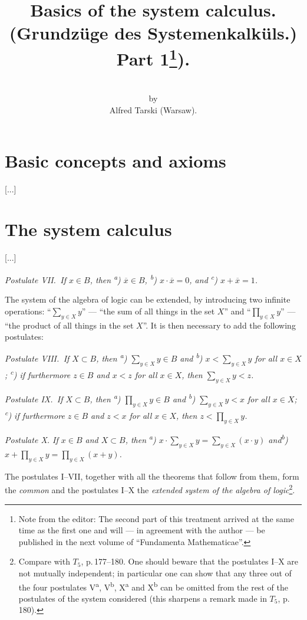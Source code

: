 \documentclass{article}
\author{\\[-2em]{\small by} \\[0.5em] Alfred Tarski (Warsaw).}
\title{Basics of the system calculus. \\ (Grundzüge des Systemenkalküls.) \\ {\small Part 1\footnote{Note from the editor: The second part of this treatment arrived at the same time as the first one and will --- in agreement with the author --- be published in the next volume of ``Fundamenta Mathematicae''.}\;).}}
\date{}%
\theoremstyle{definition}
\begin{document}
\maketitle

\noindent
[...]

\section{Basic concepts and axioms}

[...]

\section{The system calculus}

[...]

\newcommand{\no}[1]{\;\textsuperscript{#1})\;}
\newcommand{\tss}[1]{\textsuperscript{#1}}

\vspace{1em}
\textit{Postulate VII.\, If $x\in B$, then \no{a} $\overline{x}\in B$, \no{b} $x \cdot \overline{x}=0$, and \no{c} $x + \overline{x}=1$.}

\vspace{0.5em}
The system of the algebra of logic can be extended, by introducing two infinite operations: ``$\sum_{y\in X} y$'' --- ``the sum of all things in the set $X$'' and ``$\prod_{y\in X} y$'' --- ``the product of all things in the set $X$''. It is then necessary to add the following postulates:

\vspace{0.5em}
\textit{Postulate VIII.\, If $X\subset B$, then \no{a} $\sum_{y\in X} y\in B$ and \no{b} $x < \sum_{y\in X} y$ for all $x\in X$; \no{c} if furthermore $z\in B$ and $x<z$ for all $x\in X$, then $\sum_{y\in X} y<z$.}

\textit{Postulate IX.\, If $X\subset B$, then \no{a} $\prod_{y\in X} y\in B$ and \no{b} $\sum_{y\in X} y < x$ for all $x\in X$; \no{c} if furthermore $z\in B$ and $z<x$ for all $x\in X$, then $z < \prod_{y\in X} y$.}

\textit{Postulate X. If $x\in B$ and $X\subset B$, then \no{a} $x \cdot \sum_{y\in X} y = \sum_{y\in X}(x \cdot y)$ and\no{b} $x + \prod_{y\in X} y = \prod_{y\in X}(x + y)$.}

\vspace{0.5em}
The postulates I--VII, together with all the theorems that follow from them, form the \emph{common} and the postulates I--X the \emph{extended system of the algebra of logic}\footnote{Compare with $T_5$, p.\,177--180. One should beware that the postulates I--X are not mutually independent; in particular one can show that any three out of the four postulates V\tss{a}, V\tss{b}, X\tss{a} and X\tss{b} can be omitted from the rest of the postulates of the system considered (this sharpens a remark made in $T_5$, p.\,180).}.
\end{document}
